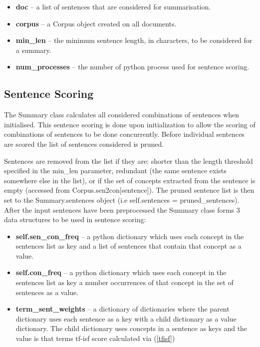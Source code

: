 \begin{itemize}
    \item \textbf{doc} – a list of sentences that are considered for summarisation.
    \item \textbf{corpus} – a Corpus object created on all documents.
    \item \textbf{min\_len} – the minimum sentence length, in characters, to be considered for a summary.
    \item \textbf{num\_processes} – the number of python process used for sentence scoring.
\end{itemize}

\subsection{Sentence Scoring}
The Summary class calculates all considered combinations of sentences when initialised. This sentence scoring is done upon initialization to allow the scoring of combinations of sentences to be done concurrently. Before individual sentences are scored the list of sentences considered is pruned.

Sentences are removed from the list if they are: shorter than the length threshold specified in the min\_len parameter, redundant (the same sentence exists somewhere else in the list), or if the set of concepts extracted from the sentence is empty (accessed from Corpus.sen2con[sentence]). The pruned sentence list is then set to the Summary.sentences object (i.e self.sentences = pruned\_sentences). After the input sentences have been preprocessed the Summary class forms 3 data structures to be used in sentence scoring:

\begin{itemize}
    \item \textbf{self.sen\_con\_freq} – a python dictionary which uses each concept in the sentences list as key and a list of sentences that contain that concept as a value.
    \item \textbf{self.con\_freq} – a python dictionary which uses each concept in the sentences list as key a number occurrences of that concept in the set of sentences as a value.
    \item \textbf{term\_sent\_weights} – a dictionary of dictionaries where the parent dictionary uses each sentence as a key with a child dictionary as a value dictionary. The child dictionary uses concepts in a sentence as keys and the value is that terms tf-isf score calculated via (\ref{tfisf})
\end{itemize}

